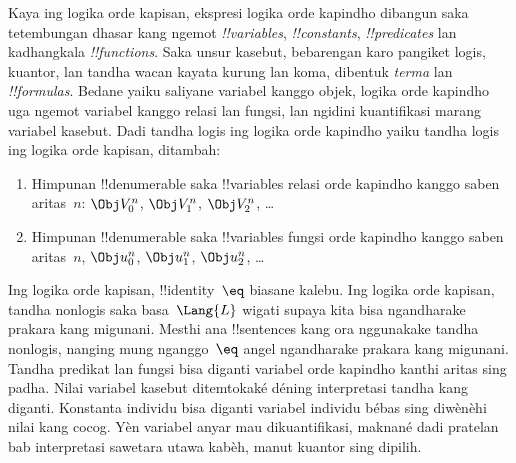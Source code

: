 \documentclass[../../../include/open-logic-section]{subfiles}
\begin{document}


Kaya ing logika orde kapisan, ekspresi logika orde kapindho dibangun
saka tetembungan dhasar kang ngemot \emph{!!{variable}s},
\emph{!!{constant}s}, \emph{!!{predicate}s} lan kadhangkala
\emph{!!{function}s}. Saka unsur kasebut, bebarengan karo pangiket logis,
kuantor, lan tandha wacan kayata kurung lan koma, dibentuk
\emph{terma} lan \emph{!!{formula}s}. Bedane yaiku saliyane variabel
kanggo objek, logika orde kapindho uga ngemot variabel kanggo relasi
lan fungsi, lan ngidini kuantifikasi marang variabel kasebut.
Dadi tandha logis ing logika orde kapindho yaiku tandha logis ing
logika orde kapisan, ditambah:

\begin{enumerate}
\item Himpunan !!{denumerable} saka !!{variable}s relasi orde kapindho
  kanggo saben aritas~$n$: $\Obj V_0^n$, $\Obj V_1^n$, $\Obj V_2^n$, \dots
\item Himpunan !!{denumerable} saka !!{variable}s fungsi orde kapindho kanggo saben aritas~$n$,
  $\Obj u_0^n$, $\Obj u_1^n$, $\Obj u_2^n$, \dots
\end{enumerate}

Ing logika orde kapisan, !!{identity}~$\eq$ biasane kalebu.
Ing logika orde kapisan, tandha nonlogis saka basa~$\Lang{L}$
wigati supaya kita bisa ngandharake prakara kang migunani.
Mesthi ana !!{sentences} kang ora nggunakake tandha nonlogis,
nanging mung nganggo~$\eq$ angel ngandharake prakara kang migunani.
Tandha predikat lan fungsi bisa diganti variabel orde kapindho
kanthi aritas sing padha. Nilai variabel kasebut ditemtokaké déning
interpretasi tandha kang diganti. Konstanta individu bisa diganti
variabel individu bébas sing diwènèhi nilai kang cocog. Yèn variabel
anyar mau dikuantifikasi, maknané dadi pratelan bab interpretasi
sawetara utawa kabèh, manut kuantor sing dipilih.
\end{document}
